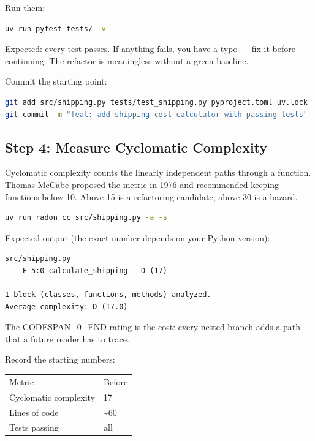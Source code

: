 \documentclass[11pt,a4paper]{book}
\begin{document}
Run them:

\begin{lstlisting}[language=Bash]
uv run pytest tests/ -v
\end{lstlisting}

Expected: every test passes. If anything fails, you have a typo --- fix it before continuing. The refactor is meaningless without a green baseline.

Commit the starting point:

\begin{lstlisting}[language=Bash]
git add src/shipping.py tests/test_shipping.py pyproject.toml uv.lock
git commit -m "feat: add shipping cost calculator with passing tests"
\end{lstlisting}

\medskip

\subsection{Step 4: Measure Cyclomatic Complexity}

Cyclomatic complexity counts the linearly independent paths through a function. Thomas McCabe proposed the metric in 1976 and recommended keeping functions below 10. Above 15 is a refactoring candidate; above 30 is a hazard.

\begin{lstlisting}[language=Bash]
uv run radon cc src/shipping.py -a -s
\end{lstlisting}

Expected output (the exact number depends on your Python version):

\begin{lstlisting}
src/shipping.py
    F 5:0 calculate_shipping - D (17)

1 block (classes, functions, methods) analyzed.
Average complexity: D (17.0)
\end{lstlisting}

The CODESPAN\_0\_END rating is the cost: every nested branch adds a path that a future reader has to trace.

Record the starting numbers:

\begin{tabular}{ll}
\hline
Metric & Before \\
Cyclomatic complexity & 17 \\
Lines of code & \textasciitilde{}60 \\
Tests passing & all \\
\hline
\end{tabular}
\end{document}
